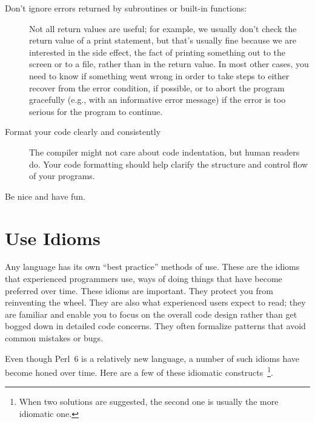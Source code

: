 \begin{description}
\item[Don't ignore errors returned by subroutines or built-in 
functions:] Not all return values are useful; for example, we 
usually don't check the return value of a print statement, but 
that's usually fine because we are interested in the side effect, 
the fact of printing something out to the screen or to a file, 
rather than in the return value. In most other cases, you need 
to know if something went wrong in order to take steps to either 
recover from the error condition, if possible, or to abort the 
program gracefully (e.g., with an informative error message) if 
the error is too serious for the program to continue.

\item[Format your code clearly and consistently] The compiler 
might not care about code indentation, but human readers do. 
Your code formatting should help clarify the structure and 
control flow of your programs.

\item[Be nice and have fun.]

\end{description}

\section{Use Idioms}

Any language has its own ``best practice'' methods of use. 
These are the idioms that experienced programmers use, ways of doing 
things that have become preferred over time. These idioms are important. 
They protect you from reinventing the wheel. They are also what 
experienced users expect to read; they are familiar 
and enable you to focus on the overall code design rather than
get bogged down in detailed code concerns. They often formalize 
patterns that avoid common mistakes or bugs.

Even though Perl~6 is a relatively new language, a number of such 
idioms have become honed over time. Here are a few of these 
idiomatic constructs~\footnote{When two solutions are suggested, 
the second one is usually the more idiomatic one.}.



